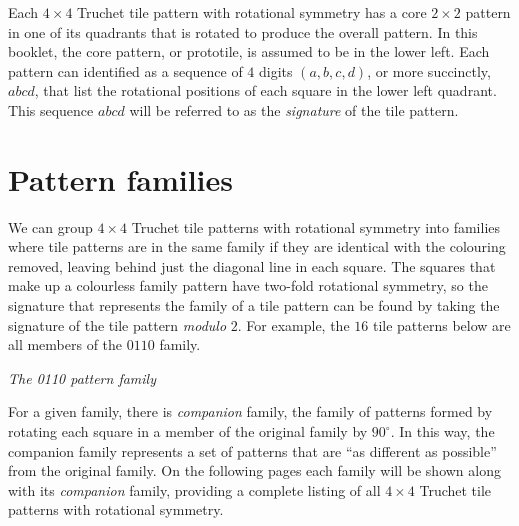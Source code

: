 \documentclass{tufte-book}
\begin{document}
\vspace{0.3cm}
\noindent
\marginnote{\centering}Each $4\times 4$
Truchet tile pattern with rotational symmetry has a core $2\times 2$ pattern in one of its quadrants that is rotated to produce the overall pattern.  In this booklet, the core pattern, or prototile, is assumed to be in the lower left. Each pattern can identified as a sequence of $4$ digits $(a,b,c,d)$, or more succinctly, $abcd$, that list the rotational positions of each square in the lower left quadrant. This sequence $abcd$ will be referred to as the \textit{signature} of the tile pattern.

\chapter{Pattern families}

\noindent
We can group $4\times 4$ Truchet tile patterns with rotational symmetry into families where tile patterns are in the same family if they are identical with the colouring removed, leaving behind just the diagonal line in each square. The squares that make up a colourless family pattern have two-fold rotational symmetry, so the signature that represents the family of a tile pattern can be found by taking the signature of the tile pattern \textit{modulo} $2$. For example, the $16$ tile patterns below are all members of the $0110$ family.  

\vspace{1.2cm}


{
\setlength{\tabcolsep}{3pt}
\renewcommand{\arraystretch}{2}

{\begin{center} \textit{The 0110 pattern family}\end{center}}
}

\vspace{0.5cm}

\noindent
For a given family, there is  \textit{companion} family, the family of patterns formed by rotating each square in a member of the original family by $90^{\circ}$. In this way, the companion family represents a set of patterns that are ``as different as possible'' from the original family. On the following pages each family will be shown along with its \textit{companion} family, providing a complete listing of all $4\times 4$ Truchet tile patterns with rotational symmetry.
\newpage

\end{document}
